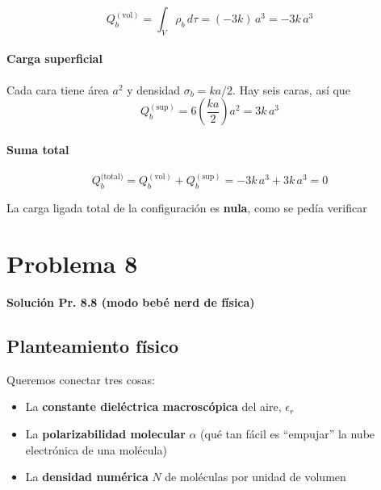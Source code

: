 \documentclass{article}
\begin{document}
\begin{equation}
Q_{b}^{(\text{vol})}
= \int_{V} \rho_{b}\,d\tau
= (-3k)\,a^{3}
= -3k\,a^{3}
\label{eq:Qb-vol-cubo}
\end{equation}

\paragraph{Carga superficial}

Cada cara tiene área $a^{2}$ y densidad $\sigma_{b} = k a/2$. Hay seis caras, así que
\begin{equation}
Q_{b}^{(\text{sup})}
= 6\left(\frac{k a}{2}\right)a^{2}
= 3k\,a^{3}
\label{eq:Qb-sup-cubo}
\end{equation}

\paragraph{Suma total}

\begin{equation}
Q_{b}^{\text{(total)}} = Q_{b}^{(\text{vol})} + Q_{b}^{(\text{sup})}
= -3k\,a^{3} + 3k\,a^{3} = 0
\label{eq:Qb-total-cubo}
\end{equation}

La carga ligada total de la configuración es \textbf{nula}, como se pedía verificar


\section{Problema 8}

\textcolor{Cinnabar}{\textbf{Solución Pr. 8.8 (modo bebé nerd de física)}} \vspace{0.4cm}

\subsection*{Planteamiento físico}

Queremos conectar tres cosas:

\begin{itemize}
  \item La \textbf{constante dieléctrica macroscópica} del aire, $\epsilon_{r}$  
  \item La \textbf{polarizabilidad molecular} $\alpha$ (qué tan fácil es “empujar” la nube electrónica de una molécula)  
  \item La \textbf{densidad numérica} $N$ de moléculas por unidad de volumen
\end{itemize}
\end{document}
